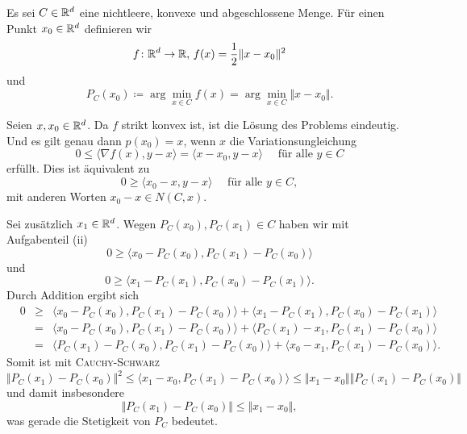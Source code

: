 
Es sei $C\in\mathbb{R}^d$ eine nichtleere, konvexe und abgeschlossene Menge. Für einen Punkt $x_0\in\mathbb{R}^d$ definieren wir
\begin{displaymath}
 f\colon \mathbb{R}^d\to\mathbb{R},\, f(x)=\frac{1}{2}\Vert x-x_0\Vert^2
\end{displaymath}
und
\begin{displaymath}
 P_C(x_0)\coloneqq \arg\min_{x\in C}f(x)=\arg\min_{x\in C}\Vert x-x_0\Vert.
\end{displaymath}
\begin{compactenum}[(i)]
 \item Seien $x,x_0\in \mathbb{R}^d$. Da $f$ strikt konvex ist, ist die Lösung des Problems eindeutig.
 Und es gilt genau dann $p(x_0)=x$, wenn $x$ die Variationsungleichung
 \begin{displaymath}
  0\leq \langle \nabla f(x),y-x\rangle=\langle x-x_0,y-x\rangle \quad\text{ für alle }y\in C
 \end{displaymath} erfüllt.
 Dies ist äquivalent zu
 \begin{displaymath}
  0\geq \langle x_0-x,y-x\rangle \quad\text{ für alle }y\in C,
 \end{displaymath}
 mit anderen Worten $x_0-x\in N(C,x)$.
 \\
 \item Sei zusätzlich $x_1\in \mathbb{R}^d$. Wegen $P_C(x_0),P_C(x_1)\in C$ haben wir mit Aufgabenteil (ii)
 \begin{displaymath}
    0\geq \langle x_0-P_C(x_0),P_C(x_1)-P_C(x_0)\rangle 
 \end{displaymath}
 und
  \begin{displaymath}
    0\geq \langle x_1-P_C(x_1),P_C(x_0)-P_C(x_1)\rangle.
 \end{displaymath}
 Durch Addition ergibt sich
 \begin{align*}
 & 0&\geq& \langle x_0-P_C(x_0),P_C(x_1)-P_C(x_0)\rangle +\langle x_1-P_C(x_1),P_C(x_0)-P_C(x_1)\rangle \\
 &&=& \langle x_0-P_C(x_0),P_C(x_1)-P_C(x_0)\rangle +\langle P_C(x_1)-x_1,P_C(x_1)-P_C(x_0)\rangle \\
 &&=&\langle P_C(x_1)-P_C(x_0),P_C(x_1)-P_C(x_0)\rangle+\langle x_0-x_1,P_C(x_1)-P_C(x_0)\rangle.
 \end{align*}
 Somit ist mit \textsc{Cauchy-Schwarz}
 \begin{displaymath}
  \Vert P_C(x_1)-P_C(x_0)\Vert^2 \leq \langle x_1-x_0,P_C(x_1)-P_C(x_0)\rangle\leq \Vert x_1-x_0\Vert \Vert P_C(x_1)-P_C(x_0)\Vert
 \end{displaymath}
 und damit insbesondere
 \begin{displaymath}
  \Vert P_C(x_1)-P_C(x_0)\Vert\leq \Vert x_1-x_0\Vert,
 \end{displaymath}
 was gerade die Stetigkeit von $P_C$ bedeutet.
\end{compactenum}


